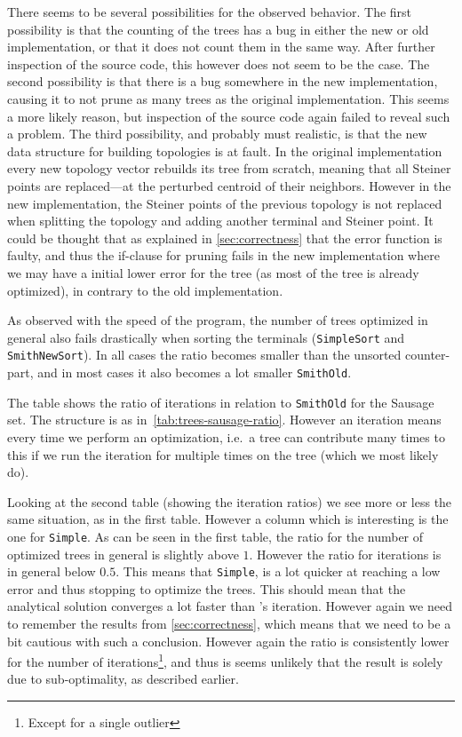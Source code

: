 There seems to be several possibilities for the observed behavior. The first
possibility is that the counting of the trees has a bug in either the new or old
implementation, or that it does not count them in the same way. After further
inspection of the source code, this however does not seem to be the case. The
second possibility is that there is a bug somewhere in the new implementation,
causing it to not prune as many trees as the original implementation. This seems
a more likely reason, but inspection of the source code again failed to reveal
such a problem. The third possibility, and probably must realistic, is that the
new data structure for building topologies is at fault. In the original
implementation every new topology vector rebuilds its tree from scratch, meaning
that all Steiner points are replaced---at the perturbed centroid of their
neighbors. However in the new implementation, the Steiner points of the previous
topology is not replaced when splitting the topology and adding another terminal
and Steiner point. It could be thought that as explained in
\cref{sec:correctness} that the error function is faulty, and thus the if-clause
for pruning fails in the new implementation where we may have a initial lower
error for the tree (as most of the tree is already optimized), in contrary to
the old implementation.

As observed with the speed of the program, the number of trees optimized in
general also fails drastically when sorting the terminals (\texttt{SimpleSort}
and \texttt{SmithNewSort}). In all cases the ratio becomes smaller than the
unsorted counter-part, and in most cases it also becomes a lot smaller
\texttt{SmithOld}.

\begin{table}[htbp]
  \centering
  
  \caption[Iteration ratio for Sausage]{The table shows the ratio of iterations
    in relation to \texttt{SmithOld} for the Sausage set. The structure is as
    in~\cref{tab:trees-sausage-ratio}. However an iteration means every time we
    perform an optimization, i.e.\ a tree can contribute many times to this if
    we run the iteration for multiple times on the tree (which we most likely
    do).\label{tab:iterations-sausage-ratio}}
\end{table}

Looking at the second table (showing the iteration ratios) we see more or less
the same situation, as in the first table. However a column which is interesting
is the one for \texttt{Simple}. As can be seen in the first table, the ratio for
the number of optimized trees in general is slightly above $1$. However the
ratio for iterations is in general below $0.5$. This means that \texttt{Simple},
is a lot quicker at reaching a low error and thus stopping to optimize the
trees. This should mean that the analytical solution converges a lot faster than
\autocite{smith1992}'s iteration. However again we need to remember the results
from \cref{sec:correctness}, which means that we need to be a bit cautious with
such a conclusion. However again the ratio is consistently lower for the number
of iterations\footnote{Except for a single outlier}, and thus is seems unlikely
that the result is solely due to sub-optimality, as described earlier.

